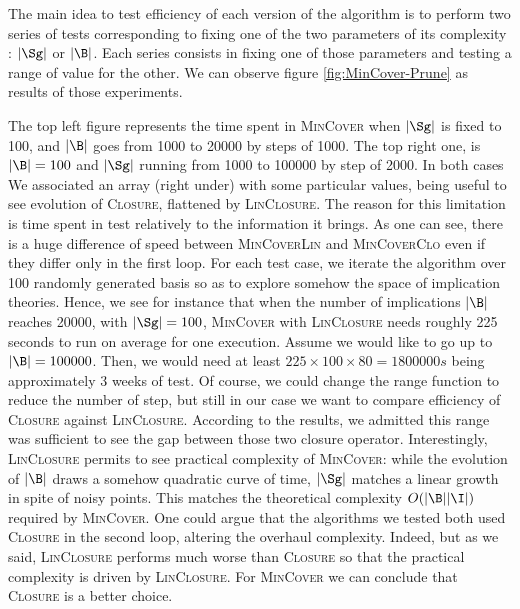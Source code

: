 The main idea to test efficiency of each version of the algorithm is to perform
two series of tests corresponding to fixing one of the two parameters of its complexity : $|\Sg|$ or $|\B|$. Each series consists in fixing one of those parameters and testing a range of value for the other. We can observe figure
\ref{fig:MinCover-Prune} as results of those experiments.


\begin{figure}[ht]
	
\end{figure}

\vspace{1.2em}

The top left figure represents the time spent in \textsc{MinCover} when $|\Sg|$ is fixed to 100, and $|\B|$ goes from 1000 to 20000 by steps of 1000. The top right one, is $|\B| = 100$ and $|\Sg|$ running from 1000 to 100000 by step of 2000. In both cases We associated an array (right under) with some particular values, being useful to see evolution of \textsc{Closure}, flattened by \textsc{LinClosure}. The reason for this limitation is time spent in test relatively to the information it brings. As one can see, there is a huge difference of speed between \textsc{MinCoverLin} and \textsc{MinCoverClo} even if they differ only in the first loop. For each test case, we iterate the algorithm over 100 randomly generated basis so as to explore somehow the space of implication theories. Hence, we see for instance that when the number of implications $|\B|$ reaches 20000, with $|\Sg| = 100$, \textsc{MinCover} with \textsc{LinClosure} needs roughly 225 seconds to run on average for one execution. Assume we would like to go up to $|\B| = 100000$. Then, we would need at least $225 \times 100 \times 80 = 1800000s$ being approximately 3 weeks of test. Of course, we could change the range function to reduce the number of step, but still in our case we want to compare efficiency of \textsc{Closure} against \textsc{LinClosure}. According to the results, we admitted this range was sufficient to see the gap between those two closure operator. Interestingly, \textsc{LinClosure} permits to see practical complexity of \textsc{MinCover}: while the evolution of $|\B|$ draws a somehow quadratic curve of time, $|\Sg|$ matches a linear growth in spite of noisy points. This matches the theoretical complexity $O(|\B||\I|)$ required by \textsc{MinCover}. One could argue that the algorithms we tested both used \textsc{Closure} in the
second loop, altering the overhaul complexity. Indeed, but as we said, \textsc{LinClosure} performs much worse than \textsc{Closure} so that the practical complexity is driven by \textsc{LinClosure}. For \textsc{MinCover}
we can conclude that \textsc{Closure} is a better choice.

